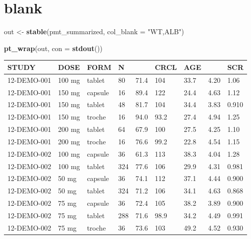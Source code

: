 \documentclass[
]{article}
\newenvironment{Shaded}{\begin{snugshade}}{\end{snugshade}}
\newcommand{\DataTypeTok}[1]{\textcolor[rgb]{0.13,0.29,0.53}{#1}}
\newcommand{\KeywordTok}[1]{\textcolor[rgb]{0.13,0.29,0.53}{\textbf{#1}}}
\newcommand{\NormalTok}[1]{#1}
\newcommand{\StringTok}[1]{\textcolor[rgb]{0.31,0.60,0.02}{#1}}
\begin{document}
\hypertarget{blank}{%
\section{blank}\label{blank}}

\begin{Shaded}
\begin{Highlighting}[]
\NormalTok{out <-}\StringTok{ }\KeywordTok{stable}\NormalTok{(pmt_summarized, }\DataTypeTok{col_blank =} \StringTok{"WT,ALB"}\NormalTok{)}

\KeywordTok{pt_wrap}\NormalTok{(out, }\DataTypeTok{con =} \KeywordTok{stdout}\NormalTok{()) }
\end{Highlighting}
\end{Shaded}

\begin{table}[h]
\centering
{\def\arraystretch{1.4}\tabcolsep=5pt
\begin{threeparttable}
\begin{tabular}[h]{lllllllll}
\hline
STUDY & DOSE & FORM & N &  & CRCL & AGE &  & SCR \\
\hline
12-DEMO-001 & 100 mg & tablet & 80 & 71.4 & 104 & 33.7 & 4.20 & 1.06 \\
12-DEMO-001 & 150 mg & capsule & 16 & 89.4 & 122 & 24.4 & 4.63 & 1.12 \\
12-DEMO-001 & 150 mg & tablet & 48 & 81.7 & 104 & 34.4 & 3.83 & 0.910 \\
12-DEMO-001 & 150 mg & troche & 16 & 94.0 & 93.2 & 27.4 & 4.94 & 1.25 \\
12-DEMO-001 & 200 mg & tablet & 64 & 67.9 & 100 & 27.5 & 4.25 & 1.10 \\
12-DEMO-001 & 200 mg & troche & 16 & 76.6 & 99.2 & 22.8 & 4.54 & 1.15 \\
12-DEMO-002 & 100 mg & capsule & 36 & 61.3 & 113 & 38.3 & 4.04 & 1.28 \\
12-DEMO-002 & 100 mg & tablet & 324 & 77.6 & 106 & 29.9 & 4.31 & 0.981 \\
12-DEMO-002 & 50 mg & capsule & 36 & 74.1 & 112 & 37.1 & 4.44 & 0.900 \\
12-DEMO-002 & 50 mg & tablet & 324 & 71.2 & 106 & 34.1 & 4.63 & 0.868 \\
12-DEMO-002 & 75 mg & capsule & 36 & 72.4 & 105 & 38.2 & 3.89 & 0.900 \\
12-DEMO-002 & 75 mg & tablet & 288 & 71.6 & 98.9 & 34.2 & 4.49 & 0.991 \\
12-DEMO-002 & 75 mg & troche & 36 & 73.6 & 103 & 49.2 & 4.52 & 0.930 \\
\hline
\end{tabular}
\end{threeparttable}
}
\end{table}
\end{document}
